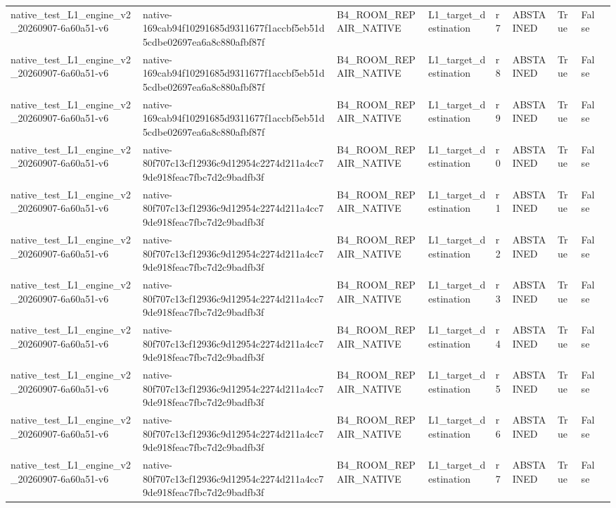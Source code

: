 \begin{tabular}{lllllllll}
native\_test\_L1\_engine\_v2\_20260907-6a60a51-v6 & native-169cab94f10291685d9311677f1accbf5eb51d5cdbe02697ea6a8c880afbf87f & B4\_ROOM\_REPAIR\_NATIVE & L1\_target\_destination & r7 & ABSTAINED & True & False &  \\
native\_test\_L1\_engine\_v2\_20260907-6a60a51-v6 & native-169cab94f10291685d9311677f1accbf5eb51d5cdbe02697ea6a8c880afbf87f & B4\_ROOM\_REPAIR\_NATIVE & L1\_target\_destination & r8 & ABSTAINED & True & False &  \\
native\_test\_L1\_engine\_v2\_20260907-6a60a51-v6 & native-169cab94f10291685d9311677f1accbf5eb51d5cdbe02697ea6a8c880afbf87f & B4\_ROOM\_REPAIR\_NATIVE & L1\_target\_destination & r9 & ABSTAINED & True & False &  \\
native\_test\_L1\_engine\_v2\_20260907-6a60a51-v6 & native-80f707c13cf12936c9d12954c2274d211a4cc79de918feac7fbc7d2c9badfb3f & B4\_ROOM\_REPAIR\_NATIVE & L1\_target\_destination & r0 & ABSTAINED & True & False &  \\
native\_test\_L1\_engine\_v2\_20260907-6a60a51-v6 & native-80f707c13cf12936c9d12954c2274d211a4cc79de918feac7fbc7d2c9badfb3f & B4\_ROOM\_REPAIR\_NATIVE & L1\_target\_destination & r1 & ABSTAINED & True & False &  \\
native\_test\_L1\_engine\_v2\_20260907-6a60a51-v6 & native-80f707c13cf12936c9d12954c2274d211a4cc79de918feac7fbc7d2c9badfb3f & B4\_ROOM\_REPAIR\_NATIVE & L1\_target\_destination & r2 & ABSTAINED & True & False &  \\
native\_test\_L1\_engine\_v2\_20260907-6a60a51-v6 & native-80f707c13cf12936c9d12954c2274d211a4cc79de918feac7fbc7d2c9badfb3f & B4\_ROOM\_REPAIR\_NATIVE & L1\_target\_destination & r3 & ABSTAINED & True & False &  \\
native\_test\_L1\_engine\_v2\_20260907-6a60a51-v6 & native-80f707c13cf12936c9d12954c2274d211a4cc79de918feac7fbc7d2c9badfb3f & B4\_ROOM\_REPAIR\_NATIVE & L1\_target\_destination & r4 & ABSTAINED & True & False &  \\
native\_test\_L1\_engine\_v2\_20260907-6a60a51-v6 & native-80f707c13cf12936c9d12954c2274d211a4cc79de918feac7fbc7d2c9badfb3f & B4\_ROOM\_REPAIR\_NATIVE & L1\_target\_destination & r5 & ABSTAINED & True & False &  \\
native\_test\_L1\_engine\_v2\_20260907-6a60a51-v6 & native-80f707c13cf12936c9d12954c2274d211a4cc79de918feac7fbc7d2c9badfb3f & B4\_ROOM\_REPAIR\_NATIVE & L1\_target\_destination & r6 & ABSTAINED & True & False &  \\
native\_test\_L1\_engine\_v2\_20260907-6a60a51-v6 & native-80f707c13cf12936c9d12954c2274d211a4cc79de918feac7fbc7d2c9badfb3f & B4\_ROOM\_REPAIR\_NATIVE & L1\_target\_destination & r7 & ABSTAINED & True & False &  \\

\end{tabular}
